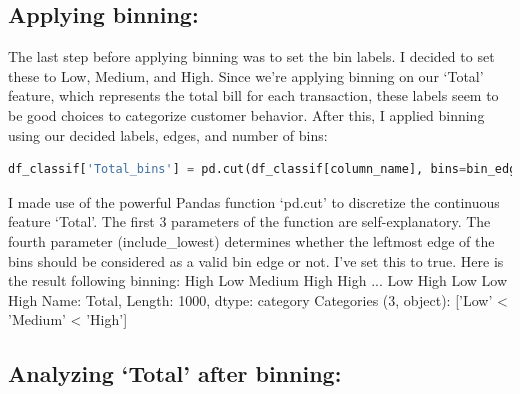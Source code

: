\subsection{Applying binning:}
The last step before applying binning was to set the bin labels. I decided to set these to Low, Medium, and High. Since we’re applying binning on our ‘Total’ feature, which represents the total bill for each transaction, these labels seem to be good choices to categorize customer behavior.
\newline 
\newline
After this, I applied binning using our decided labels, edges, and number of bins:
\begin{lstlisting}[language=Python, frame=none]
df_classif['Total_bins'] = pd.cut(df_classif[column_name], bins=bin_edges, labels=bin_labels, include_lowest=True)
\end{lstlisting}
\newline 
\newline 
I made use of the powerful Pandas function ‘pd.cut’ to discretize the continuous feature ‘Total’. The first 3 parameters of the function are self-explanatory. The fourth parameter (include\_lowest) determines whether the leftmost edge of the bins should be considered as a valid bin edge or not. I’ve set this to true.
\newline 
\newline 
Here is the result following binning:
        High
         Low
      Medium
        High
        High
\newline 
        ...
       Low
      High
       Low
       Low
      High
\newline 
Name: Total, Length: 1000, dtype: category
\newline 
Categories (3, object): ['Low' < 'Medium' < 'High']
\subsection{Analyzing ‘Total’ after binning:}

